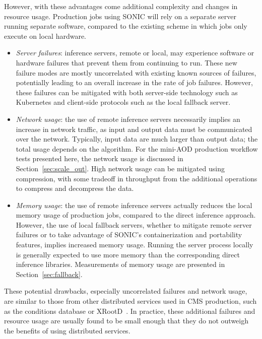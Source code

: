 However, with these advantages come additional complexity and changes in resource usage.
Production jobs using SONIC will rely on a separate server running separate software, compared to the existing scheme in which jobs only execute \CMSSW on local hardware.
\begin{itemize}
\item \emph{Server failures}: inference servers, remote or local, may experience software or hardware failures that prevent them from continuing to run. These new failure modes are mostly uncorrelated with existing known sources of failures, potentially leading to an overall increase in the rate of job failures. However, these failures can be mitigated with both server-side technology such as Kubernetes and client-side protocols such as the local fallback server.
\item \emph{Network usage}: the use of remote inference servers necessarily implies an increase in network traffic, as input and output data must be communicated over the network. Typically, input data are much larger than output data; the total usage depends on the algorithm. For the mini-AOD production workflow tests presented here, the network usage is discussed in Section~\ref{sec:scale_out}. High network usage can be mitigated using compression, with some tradeoff in throughput from the additional operations to compress and decompress the data.
\item \emph{Memory usage}: the use of remote inference servers actually reduces the local memory usage of production jobs, compared to the direct inference approach. However, the use of local fallback servers, whether to mitigate remote server failures or to take advantage of SONIC's containerization and portability features, implies increased memory usage. Running the server process locally is generally expected to use more memory than the corresponding direct inference libraries. Measurements of memory usage are presented in Section~\ref{sec:fallback}.
\end{itemize}
These potential drawbacks, especially uncorrelated failures and network usage, are similar to those from other distributed services used in CMS production, such as the conditions database or XRootD~\cite{Guida:2015gvw,Bauerdick:2012st}.
In practice, these additional failures and resource usage are usually found to be small enough that they do not outweigh the benefits of using distributed services.